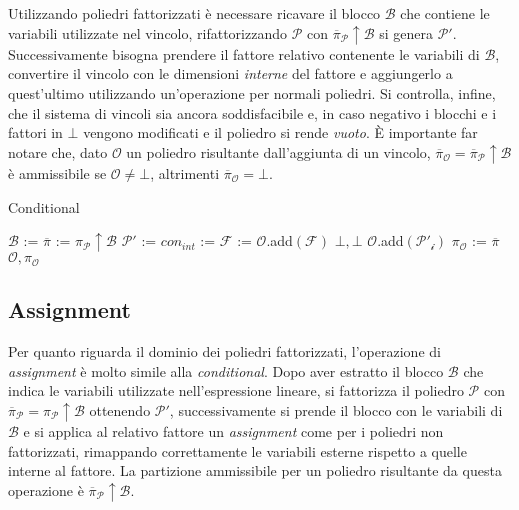 \documentclass{mimosis}
\theoremstyle{definition}
\begin{document}
Utilizzando poliedri fattorizzati è necessare ricavare il blocco \(\mathcal{B}\) che contiene le
variabili utilizzate nel vincolo, rifattorizzando \(\mathcal{P}\) con
\(\overline{\pi}_{\mathcal{P}} \uparrow \mathcal{B}\) si genera \(\mathcal{P}'\).
Successivamente bisogna prendere il fattore relativo contenente le variabili di
\(\mathcal{B}\), convertire il vincolo con le dimensioni \emph{interne} del fattore e
aggiungerlo a quest'ultimo utilizzando un'operazione per normali poliedri. Si
controlla, infine, che il sistema di vincoli sia ancora soddisfacibile e, in
caso negativo i blocchi e i fattori in \(\bot\) vengono modificati e il poliedro
si rende \emph{vuoto}. È importante far notare che, dato \(\mathcal{O}\) un poliedro
risultante dall'aggiunta di un vincolo, \(\overline{\pi}_{\mathcal{O}} = \overline{\pi}_{\mathcal{P}}
\uparrow \mathcal{B}\) è ammissibile se \(\mathcal{O} \ne \bot\), altrimenti
\(\overline{\pi}_{\mathcal{O}} = \bot\).

\begin{algorithm}[H]
\caption{Conditional}\label{conditional}
\begin{algorithmic}[1]
\State$\mathcal{B}$ := 
\State$\overline{\pi}$ := $\pi_{\mathcal{P}} \uparrow \mathcal{B}$
\State$\mathcal{P}'$ := 
\State$con_{int}$ := 
\State$\mathcal{F}$ := 
\State$\mathcal{O}$.add$(\mathcal{F})$
\State\Return$\bot, \bot$
\EndIf
\State$\mathcal{O}$.add$(\mathcal{P'_i})$
\EndIf
\EndFor
\State$\pi_{\mathcal{O}}$ := $\overline{\pi}$
\State\Return$\mathcal{O}, \pi_{\mathcal{O}}$
\EndFunction
\end{algorithmic}
\end{algorithm}

\subsection{Assignment}
\label{sec:org1846553}
Per quanto riguarda il dominio dei poliedri fattorizzati, l'operazione di
\emph{assignment} è molto simile alla \emph{conditional}. Dopo aver estratto il blocco
\(\mathcal{B}\) che indica le variabili utilizzate nell'espressione lineare, si
fattorizza il poliedro \(\mathcal{P}\) con \(\overline{\pi}_{\mathcal{P}} =
\pi_{\mathcal{P}} \uparrow \mathcal{B}\) ottenendo \(\mathcal{P}'\),
successivamente si prende il blocco con le variabili di \(\mathcal{B}\) e si
applica al relativo fattore un \emph{assignment} come per i poliedri non
fattorizzati, rimappando correttamente le variabili esterne rispetto a quelle
interne al fattore. La partizione ammissibile per un poliedro risultante da
questa operazione è \(\overline{\pi}_{\mathcal{P}} \uparrow \mathcal{B}\).
\end{document}

